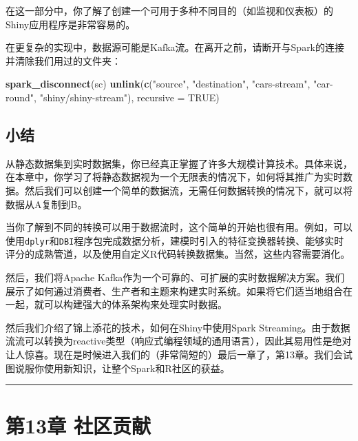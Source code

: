 \documentclass[
]{article}
\newenvironment{Shaded}{\begin{snugshade}}{\end{snugshade}}
\newcommand{\DataTypeTok}[1]{\textcolor[rgb]{0.13,0.29,0.53}{#1}}
\newcommand{\KeywordTok}[1]{\textcolor[rgb]{0.13,0.29,0.53}{\textbf{#1}}}
\newcommand{\NormalTok}[1]{#1}
\newcommand{\OtherTok}[1]{\textcolor[rgb]{0.56,0.35,0.01}{#1}}
\newcommand{\StringTok}[1]{\textcolor[rgb]{0.31,0.60,0.02}{#1}}
\begin{document}
在这一部分中，你了解了创建一个可用于多种不同目的（如监视和仪表板）的Shiny应用程序是非常容易的。

在更复杂的实现中，数据源可能是Kafka流。在离开之前，请断开与Spark的连接并清除我们用过的文件夹：

\begin{Shaded}
\begin{Highlighting}[]
\KeywordTok{spark_disconnect}\NormalTok{(sc)}
\KeywordTok{unlink}\NormalTok{(}\KeywordTok{c}\NormalTok{(}\StringTok{"source"}\NormalTok{, }\StringTok{"destination"}\NormalTok{, }\StringTok{"cars-stream"}\NormalTok{, }\StringTok{"car-round"}\NormalTok{, }\StringTok{"shiny/shiny-stream"}\NormalTok{), }
    \DataTypeTok{recursive =} \OtherTok{TRUE}\NormalTok{)}
\end{Highlighting}
\end{Shaded}

\hypertarget{ux5c0fux7ed3-10}{%
\subsection{小结}\label{ux5c0fux7ed3-10}}

从静态数据集到实时数据集，你已经真正掌握了许多大规模计算技术。具体来说，在本章中，你学习了将静态数据视为一个无限表的情况下，如何将其推广为实时数据。然后我们可以创建一个简单的数据流，无需任何数据转换的情况下，就可以将数据从A复制到B。

当你了解到不同的转换可以用于数据流时，这个简单的开始也很有用。例如，可以使用\texttt{dplyr}和\texttt{DBI}程序包完成数据分析，建模时引入的特征变换器转换、能够实时评分的成熟管道，以及使用自定义R代码转换数据集。当然，这些内容需要消化。

然后，我们将Apache
Kafka作为一个可靠的、可扩展的实时数据解决方案。我们展示了如何通过消费者、生产者和主题来构建实时系统。如果将它们适当地组合在一起，就可以构建强大的体系架构来处理实时数据。

然后我们介绍了锦上添花的技术，如何在Shiny中使用Spark
Streaming。由于数据流流可以转换为reactive类型（响应式编程领域的通用语言），因此其易用性是绝对让人惊喜。现在是时候进入我们的（非常简短的）最后一章了，第13章。我们会试图说服你使用新知识，让整个Spark和R社区的获益。

\begin{center}\rule{0.5\linewidth}{\linethickness}\end{center}

\hypertarget{ux7b2c13ux7ae0-ux793eux533aux8d21ux732e}{%
\section{第13章
社区贡献}\label{ux7b2c13ux7ae0-ux793eux533aux8d21ux732e}}
\end{document}
